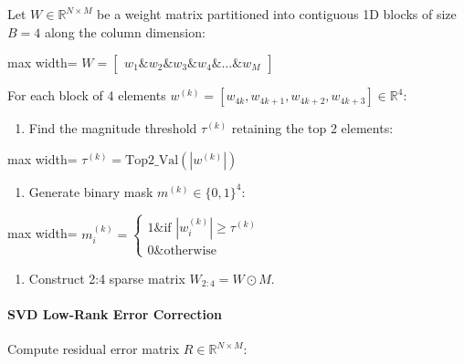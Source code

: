 Let $W \in \mathbb{R}^{N \times M}$ be a weight matrix partitioned into contiguous 1D blocks of size $B = 4$ along the column dimension:

\begin{center}
\begin{adjustbox}{max width=\columnwidth}
$\displaystyle
W = \begin{bmatrix} w_1 \& w_2 \& w_3 \& w_4 \& \dots \& w_M \end{bmatrix}
$
\end{adjustbox}
\end{center}

For each block of 4 elements $w^{(k)} = [w_{4k}, w_{4k+1}, w_{4k+2}, w_{4k+3}] \in \mathbb{R}^4$:

\begin{enumerate}
\item Find the magnitude threshold $\tau^{(k)}$ retaining the top 2 elements:
\end{enumerate}
\begin{center}
\begin{adjustbox}{max width=\columnwidth}
$\displaystyle
\tau^{(k)} = \text{Top2\_Val}\left( |w^{(k)}| \right)
$
\end{adjustbox}
\end{center}
\begin{enumerate}
\item Generate binary mask $m^{(k)} \in \{0, 1\}^4$:
\end{enumerate}
\begin{center}
\begin{adjustbox}{max width=\columnwidth}
$\displaystyle
m_i^{(k)} = \begin{cases} 1 \& \text{if } |w_i^{(k)}| \ge \tau^{(k)} \\ 0 \& \text{otherwise} \end{cases}
$
\end{adjustbox}
\end{center}
\begin{enumerate}
\item Construct 2:4 sparse matrix $W_{2:4} = W \odot M$.

\end{enumerate}
\paragraph{SVD Low-Rank Error Correction}

Compute residual error matrix $R \in \mathbb{R}^{N \times M}$:

